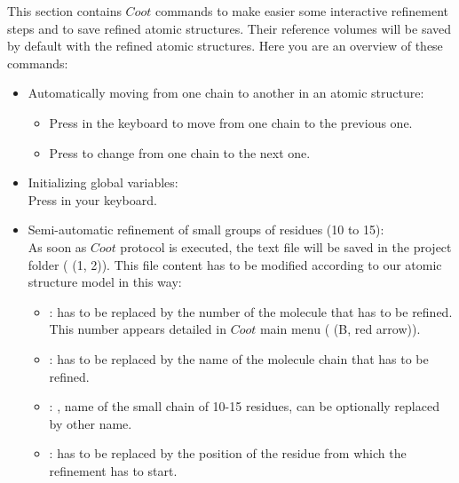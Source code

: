 \begin{itemize}
\begin{itemize}
    This section contains $Coot$ commands to make easier some interactive refinement steps and to save refined atomic structures. Their reference volumes will be saved by default with the refined atomic structures. Here you are an overview of these commands:\\
    \begin{itemize}
     \item Automatically moving from one chain to another in an atomic structure:\\
     \begin{itemize}
      \item Press  in the keyboard to move from one chain to the previous one.\\
      \item Press  to change from one chain to the next one.\\
     \end{itemize} 
     \item Initializing global variables:\\
     Press  in your keyboard.\\ 
     \item Semi-automatic refinement of small groups of residues (10 to 15):\\As soon as $Coot$ protocol is executed, the text file  will be saved in the project folder  ( (1, 2)). This file content has to be modified according to our atomic structure model in this way:\\
     \begin{itemize}
      \item {}:  has to be replaced by the number of the molecule that has to be refined. This number appears detailed in $Coot$ main menu  ( (B, red arrow)).\\
      \item {}:  has to be replaced by the name of the molecule chain that has to be refined.\\
      \item {}: , name of the small chain of 10-15 residues, can be optionally replaced by other name.\\
      \item {}:  has to be replaced by the position of the residue from which the refinement has to start.\\

\end{itemize}
\end{itemize}
\end{itemize}
\end{itemize}
